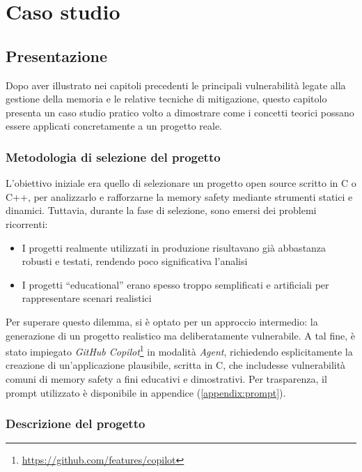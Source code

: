 \chapter{Caso studio}
\label{chap:real_case}

\section{Presentazione}
\label{sec:presentation}

Dopo aver illustrato nei capitoli precedenti le principali vulnerabilità legate alla
gestione della memoria e le relative tecniche di mitigazione, questo capitolo
presenta un caso studio pratico volto a dimostrare come i concetti teorici
possano essere applicati concretamente a un progetto reale.

\subsection*{Metodologia di selezione del progetto}

L'obiettivo iniziale era quello di selezionare un progetto open source scritto in
C o C++, per analizzarlo e rafforzarne la memory safety mediante strumenti
statici e dinamici. Tuttavia, durante la fase di selezione, sono emersi dei problemi
ricorrenti:
\begin{itemize}
  \item I progetti realmente utilizzati in produzione risultavano già abbastanza
    robusti e testati, rendendo poco significativa l'analisi

  \item I progetti ``educational'' erano spesso troppo semplificati e artificiali
    per rappresentare scenari realistici
\end{itemize}

Per superare questo dilemma, si è optato per un approccio intermedio: la generazione
di un progetto realistico ma deliberatamente vulnerabile. A tal fine, è stato impiegato
\textit{GitHub Copilot}\footnote{\url{https://github.com/features/copilot}} in modalità
\textit{Agent}, richiedendo esplicitamente la creazione di un'applicazione plausibile,
scritta in C, che includesse vulnerabilità comuni di memory safety a fini educativi
e dimostrativi. Per trasparenza, il prompt utilizzato è disponibile in appendice
(\autoref{appendix:prompt}).

\subsection*{Descrizione del progetto}

